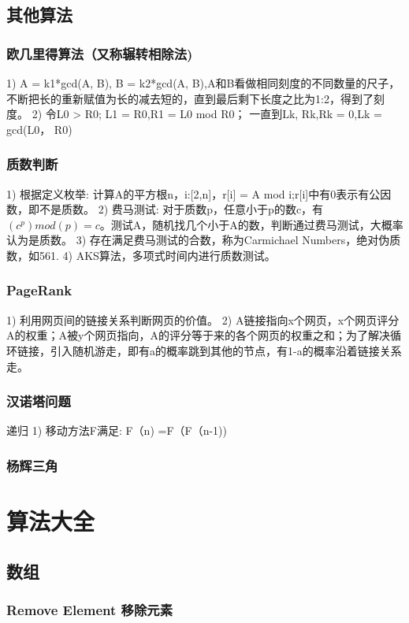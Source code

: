\documentclass[UTF8]{../computerUniverse}
\begin{document}
\section{其他算法}

\subsection{欧几里得算法（又称辗转相除法) }
1) A = k1*gcd(A, B), B = k2*gcd(A, B),A和B看做相同刻度的不同数量的尺子，不断把长的重新赋值为长的减去短的，直到最后剩下长度之比为1:2，得到了刻度。
2) 令L0 > R0;
L1 = R0,R1 = L0 mod R0；
一直到Lk, Rk,Rk = 0,Lk = gcd(L0， R0)


\subsection{质数判断}
1) 根据定义枚举: 计算A的平方根n，i:[2,n]，r[i] = A mod i;r[i]中有0表示有公因数，即不是质数。
2) 费马测试: 对于质数p，任意小于p的数c，有$(c^p)mod(p) = c$。测试A，随机找几个小于A的数，判断通过费马测试，大概率认为是质数。
3) 存在满足费马测试的合数，称为Carmichael Numbers，绝对伪质数，如561.
4) AKS算法，多项式时间内进行质数测试。


\subsection{PageRank}
1) 利用网页间的链接关系判断网页的价值。
2) A链接指向x个网页，x个网页评分A的权重；A被y个网页指向，A的评分等于来的各个网页的权重之和；为了解决循环链接，引入随机游走，即有a的概率跳到其他的节点，有1-a的概率沿着链接关系走。


\subsection{汉诺塔问题}
递归
1) 移动方法F满足: F（n) =F（F（n-1))


\subsection{杨辉三角}


\chapter{算法大全}


\section{数组}
\subsection{Remove Element  移除元素}
\end{document}
